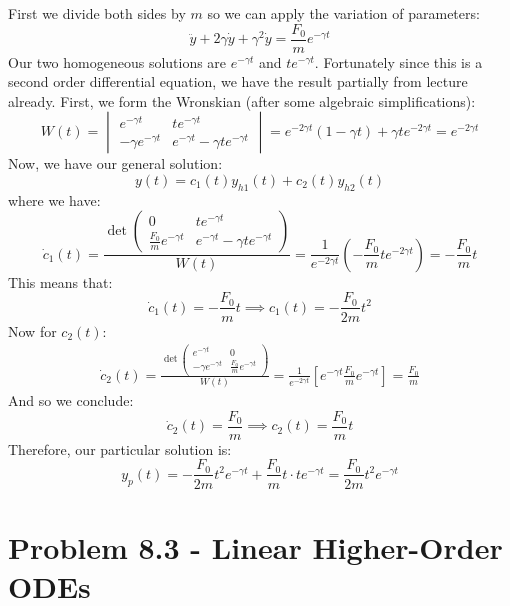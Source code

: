 \documentclass{article}
\begin{document}
\begin{solution}
	First we divide both sides by $m$ so we can apply the variation of parameters:
	\[
		\ddot y + 2 \gamma \dot y + \gamma^2 \dot y = \frac{F_0}{m}e^{- \gamma t}
	\] 
	Our two homogeneous solutions are $e^{-\gamma t}$ and $te^{- \gamma t}$. Fortunately since this is a 
	second order differential equation, we have the result partially from lecture already. First, we 
	form the Wronskian (after some algebraic simplifications):
	\[
		W(t) = \begin{vmatrix} e^{- \gamma t} & te^{- \gamma t}\\ -\gamma e^{- \gamma t} & e^{- \gamma t} - \gamma te^{- \gamma t}\end{vmatrix} = e^{- 2 \gamma t} (1 - \gamma t) + \gamma t e^{- 2 \gamma t} = e^{- 2 \gamma t}
	\] 
	Now, we have our general solution:
	\[
		y(t) = c_1(t)y_{h 1}(t) + c_2(t) y_{h 2}(t)
	\] 
	where we have:
	\[
		\dot c_1(t) = \frac{\det \begin{pmatrix} 0 & te^{- \gamma t} \\ \frac{F_0}{m}e^{- \gamma t} & e^{- \gamma t} - \gamma t e^{- \gamma t} \end{pmatrix}}{W(t)} = \frac{1}{e^{-2 \gamma t}}\left(-\frac{F_0}{m}te^{- 2 \gamma t}\right) = -\frac{F_0}{m}t
	\]
	This means that:
	\[
	\dot c_1(t) = -\frac{F_0}{m}t \implies c_1(t) = -\frac{F_0}{2m}t^2
	\] 
	Now for $c_2(t)$:
	\begin{align*}
		\dot c_2(t) =  \frac{\det \begin{pmatrix} e^{- \gamma t} & 0\\ -\gamma e^{- \gamma t} & \frac{F_0}{m}e^{- \gamma t} \end{pmatrix}}{W(t)} = \frac{1}{e^{-2 \gamma t}}\left[e^{- \gamma t} \frac{F_0}{m}e^{- \gamma t}\right]
		= \frac{F_0}{m}
	\end{align*}
	And so we conclude: 
	\[
	\dot c_2(t) = \frac{F_0}{m}\implies c_2(t) = \frac{F_0}{m}t
	\] 
	Therefore, our particular solution is:
	\[
		y_p(t) = -\frac{F_0}{2m}t^2 e^{- \gamma t} + \frac{F_0}{m} t \cdot te^{- \gamma t} = \frac{F_0}{2m}t^2 e^{- \gamma t}
	\] 
\end{solution}

\bigskip
\dphline
\pagebreak
\section*{Problem 8.3 - Linear Higher-Order ODEs}
\end{document}
